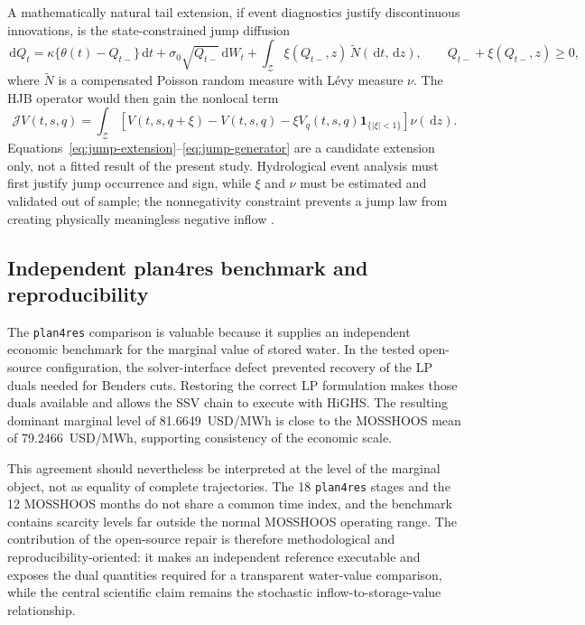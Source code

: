 \documentclass[11pt,a4paper]{article}
\newcommand{\dif}{\,\mathrm{d}}
\begin{document}
A mathematically natural tail extension, if event diagnostics justify discontinuous
innovations, is the state-constrained jump diffusion
\begin{equation}
 \dif Q_t=\kappa\{\theta(t)-Q_{t-}\}\dif t
 +\sigma_0\sqrt{Q_{t-}}\dif W_t
 +\int_{\mathcal Z}\xi(Q_{t-},z)\,\widetilde N(\dif t,\dif z),
 \qquad Q_{t-}+\xi(Q_{t-},z)\ge0,
 \label{eq:jump-extension}
\end{equation}
where $\widetilde N$ is a compensated Poisson random measure with L\'evy measure
$\nu$. The HJB operator would then gain the nonlocal term
\begin{equation}
 \mathcal J V(t,s,q)=\int_{\mathcal Z}\!\left[
 V(t,s,q+\xi)-V(t,s,q)-\xi V_q(t,s,q)\mathbf 1_{\{|\xi|<1\}}
 \right]\nu(\dif z).
 \label{eq:jump-generator}
\end{equation}
Equations~\eqref{eq:jump-extension}--\eqref{eq:jump-generator} are a candidate
extension only, not a fitted result of the present study. Hydrological event analysis
must first justify jump occurrence and sign, while $\xi$ and $\nu$ must be estimated
and validated out of sample; the nonnegativity constraint prevents a jump law from
creating physically meaningless negative inflow \cite{applebaum2009,katz2002}.

\subsection{Independent plan4res benchmark and reproducibility}
The \texttt{plan4res} comparison is valuable because it supplies an independent
economic benchmark for the marginal value of stored water. In the tested open-source
configuration, the solver-interface defect prevented recovery of the LP duals needed
for Benders cuts. Restoring the correct LP formulation makes those duals available and
allows the SSV chain to execute with HiGHS. The resulting dominant marginal level of
81.6649~USD/MWh is close to the MOSSHOOS mean of 79.2466~USD/MWh, supporting
consistency of the economic scale.

This agreement should nevertheless be interpreted at the level of the marginal object,
not as equality of complete trajectories. The 18 \texttt{plan4res} stages and the 12
MOSSHOOS months do not share a common time index, and the benchmark contains scarcity
levels far outside the normal MOSSHOOS operating range. The contribution of the
open-source repair is therefore methodological and reproducibility-oriented: it makes
an independent reference executable and exposes the dual quantities required for a
transparent water-value comparison, while the central scientific claim remains the
stochastic inflow-to-storage-value relationship.
\end{document}

